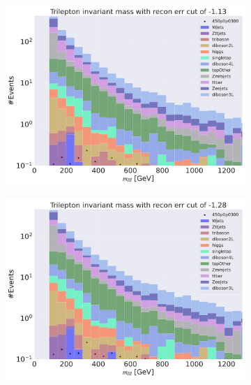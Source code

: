 \begin{figure}[H]
    \centering
    \begin{subfigure}{.45\textwidth}
        \includegraphics[width=\textwidth]{Figures/AE_testing/big/3lep/b_data_recon_big_rm3_feats_sig_450p0p0300_mlll_recon_errcut_-1.13.pdf}
        \caption{ }
        \label{fig:AE_3lep_big_450_cut_mlll}
    \end{subfigure}
    \hfill
    \begin{subfigure}{.45\textwidth}
        \includegraphics[width=\textwidth]{Figures/AE_testing/small/3lep/b_data_recon_big_rm3_feats_sig_450p0p0300_mlll_recon_errcut_-1.28.pdf}
        \caption{}
        \label{fig:AE_3lep_small_450_cut_mlll}
    \end{subfigure}

\end{figure}
